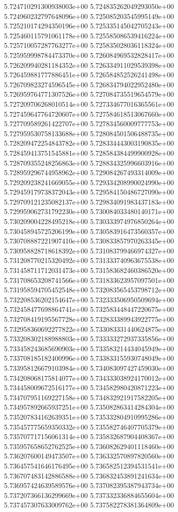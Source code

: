 5.724710291300938003e+00
5.724835262049293050e+00
5.724960232797648096e+00
5.725085203545995149e+00
5.725210174294350196e+00
5.725335145042705243e+00
5.725460115791061178e+00
5.725585086539416224e+00
5.725710057287763277e+00
5.725835028036118324e+00
5.725959998784473370e+00
5.726084969532828417e+00
5.726209940281184352e+00
5.726334911029539398e+00
5.726459881777886451e+00
5.726584852526241498e+00
5.726709823274596545e+00
5.726834794022952480e+00
5.726959764771307526e+00
5.727084735519654579e+00
5.727209706268010514e+00
5.727334677016365561e+00
5.727459647764720607e+00
5.727584618513067660e+00
5.727709589261422707e+00
5.727834560009777753e+00
5.727959530758133688e+00
5.728084501506488735e+00
5.728209472254843782e+00
5.728334443003190835e+00
5.728459413751545881e+00
5.728584384499900928e+00
5.728709355248256863e+00
5.728834325996603916e+00
5.728959296744958962e+00
5.729084267493314009e+00
5.729209238241669055e+00
5.729334208990024990e+00
5.729459179738372043e+00
5.729584150486727090e+00
5.729709121235082137e+00
5.729834091983437183e+00
5.729959062731792230e+00
5.730084033480140171e+00
5.730209004228495218e+00
5.730333974976850264e+00
5.730458945725206199e+00
5.730583916473560357e+00
5.730708887221907410e+00
5.730833857970263345e+00
5.730958828718618392e+00
5.731083799466974327e+00
5.731208770215320492e+00
5.731333740963675538e+00
5.731458711712031473e+00
5.731583682460386520e+00
5.731708653208741566e+00
5.731833623957097501e+00
5.731958594705452548e+00
5.732083565453798712e+00
5.732208536202154647e+00
5.732333506950509694e+00
5.732458477698864741e+00
5.732583448447220675e+00
5.732708419195567728e+00
5.732833389943922775e+00
5.732958360692277822e+00
5.733083331440624875e+00
5.733208302188988803e+00
5.733333272937335856e+00
5.733458243685690903e+00
5.733583214434045949e+00
5.733708185182400996e+00
5.733833155930748049e+00
5.733958126679103984e+00
5.734083097427459030e+00
5.734208068175814077e+00
5.734333038924170012e+00
5.734458009672516177e+00
5.734582980420871223e+00
5.734707951169227158e+00
5.734832921917582205e+00
5.734957892665937251e+00
5.735082863414284304e+00
5.735207834162639351e+00
5.735332804910995286e+00
5.735457775659350332e+00
5.735582746407705379e+00
5.735707717156061314e+00
5.735832687904408367e+00
5.735957658652762525e+00
5.736082629401118460e+00
5.736207600149473507e+00
5.736332570897820560e+00
5.736457541646176495e+00
5.736582512394531541e+00
5.736707483142886588e+00
5.736832453891241634e+00
5.736957424639589576e+00
5.737082395387943734e+00
5.737207366136299669e+00
5.737332336884655604e+00
5.737457307633009762e+00
5.737582278381364809e+00
